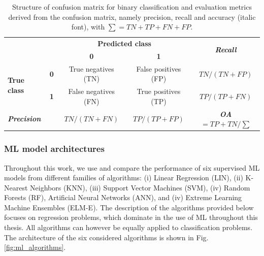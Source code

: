 \begin{table}[tb]
\footnotesize
\centering
\caption{Structure of confusion matrix for binary classification and evaluation metrics derived from the confusion matrix, namely precision, recall and accuracy (italic font), with $\sum = TN+TP+FN+FP$.}
\label{tab:conf_matrix}
\begin{tabular}{llccc}
\hline
 &  & \multicolumn{2}{c}{\textbf{Predicted class}} & \multirow{2}{*}{\textit{\textbf{Recall}}} \\
 &  & \textbf{0} & \textbf{1} &  \\ \hline
\multirow{2}{*}{\textbf{True class}} & \textbf{0} & True negatives (TN) & False positives (FP) & $TN/(TN + FP)$ \\
 & \textbf{1} & False negatives (FN) & True positives (TP) & $TP/(TP + FN)$ \\ \hline
\textit{\textbf{Precision}} & \textit{} & $TN/(TN + FN)$ & $TP/(TP + FP)$ & \textit{\textbf{OA} $= TP+TN/\sum$} \\ \hline
\end{tabular}
\end{table}

\subsubsection{ML model architectures}

Throughout this work, we use and compare the performance of six supervised ML models from different families of algorithms: (i) Linear Regression (LIN), (ii) K-Nearest Neighbors (KNN), (iii) Support Vector Machines (SVM), (iv) Random Forests (RF), Artificial Neural Networks (ANN), and (iv) Extreme Learning Machine Ensembles (ELM-E). The description of the algorithms provided below focuses on regression problems, which dominate in the use of ML throughout this thesis. All algorithms can however be equally applied to classification problems. The architecture of the six considered algorithms is shown in Fig. \ref{fig:ml_algorithms}.


